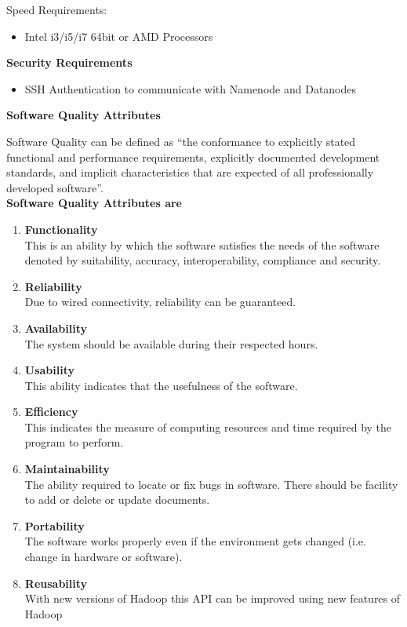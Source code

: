 \documentclass[oneside,a4paper,12pt]{report}
\begin{document}
Speed Requirements:
\begin{itemize}
\item Intel i3/i5/i7 64bit or AMD Processors
\end{itemize}

\textbf{Security Requirements}
\begin{itemize}
\item SSH Authentication to communicate with Namenode and Datanodes
\end{itemize}

\textbf{Software Quality Attributes}

Software Quality can be defined as “the conformance to explicitly stated functional and performance requirements, explicitly documented development standards, and implicit characteristics that are expected of all professionally developed software”.\\
	
\textbf{Software Quality Attributes are}

\begin{enumerate}
\item \textbf{Functionality} \\
This is an ability by which the software satisfies the needs of the software denoted by suitability, accuracy, interoperability, compliance and security.

\item \textbf{Reliability} \\
Due to wired connectivity, reliability can be guaranteed.

\item \textbf{Availability} \\
The system should be available during their respected hours.

\item \textbf{Usability} \\
This ability indicates that the usefulness of the software.

\item \textbf{Efficiency} \\
This indicates the measure of computing resources and time required by the program to perform.

\item \textbf{Maintainability} \\
The ability required to locate or fix bugs in software. There should be facility to add or delete or update documents.

\item \textbf{Portability} \\
The software works properly even if the environment gets changed (i.e. change in hardware or software).

\item \textbf{Reusability} \\
With new versions of Hadoop this API can be improved using new features of Hadoop
\end{enumerate}
\end{document}
